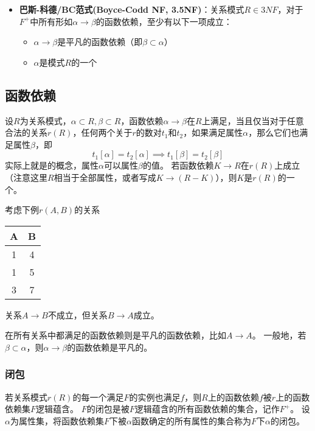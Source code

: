 \begin{itemize}
	\item \textbf{巴斯-科德/BC范式(Boyce-Codd NF, 3.5NF)}：关系模式$R\in 3NF$，对于$F^+$中所有形如$\alpha\to\beta$的函数依赖，至少有以下一项成立：
	\begin{itemize}
		\item $\alpha\to\beta$是平凡的函数依赖（即$\beta\subset\alpha$）
		\item $\alpha$是模式$R$的一个
	\end{itemize}
\end{itemize}

\subsection{函数依赖}
\begin{definition}
设$R$为关系模式，$\alpha\subset R,\beta\subset R$，函数依赖$\alpha\to\beta$在$R$上满足，当且仅当对于任意合法的关系$r(R)$，任何两个关于$r$的数对$t_1$和$t_2$，如果满足属性$\alpha$，那么它们也满足属性$\beta$，即
\[t_1[\alpha]=t_2[\alpha]\implies t_1[\beta]=t_2[\beta]\]
实际上就是的概念，属性$\alpha$可以属性$\beta$的值。
若函数依赖$K\to R$在$r(R)$上成立（注意这里$R$相当于全部属性，或者写成$K\to (R-K)$），则$K$是$r(R)$的一个。
\end{definition}
\begin{example}
考虑下例$r(A,B)$的关系
\begin{center}
\begin{tabular}{|c|c|}\hline
A & B\\\hline
1 & 4\\\hline
1 & 5\\\hline
3 & 7\\\hline
\end{tabular}
\end{center}
关系$A\to B$不成立，但关系$B\to A$成立。
\end{example}

\begin{definition}[平凡]
在所有关系中都满足的函数依赖则是平凡的函数依赖，比如$A\to A$。
一般地，若$\beta\subset\alpha$，则$\alpha\to\beta$的函数依赖是平凡的。
\end{definition}

\subsubsection{闭包}
\begin{definition}[逻辑蕴含与闭包]
若关系模式$r(R)$的每一个满足$F$的实例也满足$f$，则$R$上的函数依赖$f$被$r$上的函数依赖集$F$逻辑蕴含。
$F$的闭包是被$F$逻辑蕴含的所有函数依赖的集合，记作$F^+$。
设$\alpha$为属性集，将函数依赖集$F$下被$\alpha$函数确定的所有属性的集合称为$F$下$\alpha$的闭包。
\end{definition}

